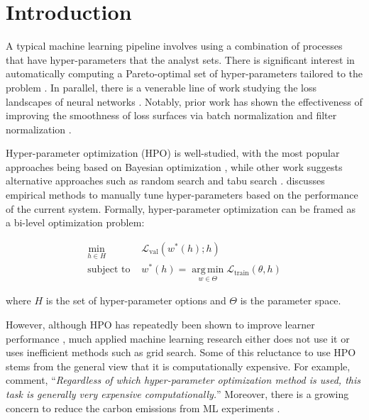 \documentclass[preprint,12pt]{elsarticle}
\DeclareMathOperator*{\argmin}{arg\,min}
\begin{document}
\section{Introduction}

A typical machine learning pipeline involves using a combination of processes that have hyper-parameters that the analyst sets. There is significant interest in automatically computing a Pareto-optimal set of hyper-parameters tailored to the problem \cite{agrawal2019dodge, cowen2022hebo, li2017hyperband, bergstra2011algorithms, bergstra2012random, falkner2018bohb, eriksson2019scalable, ansel:pact:2014, snoek2012practical, hernandez2014predictive, swersky2014freeze, snoek2015scalable, bergstra2013making}. In parallel, there is a venerable line of work studying the loss landscapes of neural networks \cite{hochreiter1994simplifying, hochreiter1997flat, hinton1993keeping, chaudhari2019entropy, keskar2016large, dziugaite2017computing, mcallester1999pac, neyshabur2014search, neyshabur2017exploring, li2018visualizing, seong2018towards, dauphin2014identifying, choromanska2015loss, zhang2021understanding}. Notably, prior work has shown the effectiveness of improving the smoothness of loss surfaces via batch normalization \cite{santurkar2018does} and filter normalization \cite{li2018visualizing}.

Hyper-parameter optimization (HPO) is well-studied, with the most popular approaches being based on Bayesian optimization \cite{snoek2012practical, hernandez2014predictive, swersky2014freeze, bergstra2013making}, while other work suggests alternative approaches such as random search \cite{bergstra2012random} and tabu search \cite{agrawal2019dodge}. \citet{smith2018disciplined} discusses empirical methods to manually tune hyper-parameters based on the performance of the current system. Formally, hyper-parameter optimization can be framed as a bi-level optimization problem:

\begin{equation}
\begin{aligned}
    \min\limits_{h \in H} \text{ } & \mathcal{L}_{\text{val}}(w^*(h); h) \\
    \text{subject to } & w^*(h) = \argmin\limits_{w \in \Theta} \mathcal{L}_{\text{train}}(\theta, h)
\end{aligned}
\end{equation}

where $H$ is the set of hyper-parameter options and $\Theta$ is the parameter space.

However, although HPO has repeatedly been shown to improve learner performance \cite{Tantithamthavorn16,majumder2018500+}, much applied machine learning research either does not use it or uses inefficient methods such as grid search. Some of this reluctance to use HPO stems from the general view that it is computationally expensive. For example, \citet{tran2020hyper} comment, ``\textit{Regardless of which hyper-parameter optimization method is used, this task is generally very expensive computationally.}'' Moreover, there is a growing concern to reduce the carbon emissions from ML experiments \cite{lacoste2019quantifying}.
\end{document}
